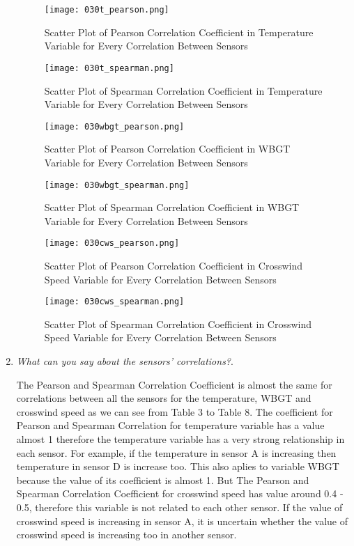 \documentclass[a4paper,12pt]{article} %
\begin{document}
\begin{enumerate}
\setlength{\belowcaptionskip}{-15pt}
\begin{figure}[H]
    \centering
    \texttt{[image: 030t\_pearson.png]}
    \caption{Scatter Plot of Pearson Correlation Coefficient in Temperature Variable for Every Correlation Between Sensors}
    \label{fig:my_label}
\end{figure}
\begin{figure}[H]
    \centering
    \texttt{[image: 030t\_spearman.png]}
    \caption{Scatter Plot of Spearman Correlation Coefficient in Temperature Variable for Every Correlation Between Sensors}
    \label{fig:my_label}
\end{figure}
\begin{figure}[H]
    \centering
    \texttt{[image: 030wbgt\_pearson.png]}
    \caption{Scatter Plot of Pearson Correlation Coefficient in WBGT Variable for Every Correlation Between Sensors}
    \label{fig:my_label}
\end{figure}
\begin{figure}[H]
    \centering
    \texttt{[image: 030wbgt\_spearman.png]}
    \caption{Scatter Plot of Spearman Correlation Coefficient in WBGT Variable for Every Correlation Between Sensors}
    \label{fig:my_label}
\end{figure}
\begin{figure}[H]
    \centering
    \texttt{[image: 030cws\_pearson.png]}
    \caption{Scatter Plot of Pearson Correlation Coefficient in Crosswind Speed Variable for Every Correlation Between Sensors}
    \label{fig:my_label}
\end{figure}
\begin{figure}[H]
    \centering
    \texttt{[image: 030cws\_spearman.png]}
    \caption{Scatter Plot of Spearman Correlation Coefficient in Crosswind Speed Variable for Every Correlation Between Sensors}
    \label{fig:my_label}
\end{figure}


	
\item {\it What can you say about the sensors’ correlations?}. %
	
The Pearson and Spearman Correlation Coefficient is almost the same for correlations between all the sensors for the temperature, WBGT and crosswind speed as we can see from Table 3 to Table 8. The coefficient for Pearson and Spearman Correlation for temperature variable has a value almost 1 therefore the temperature variable has a very strong relationship in each sensor. For example, if the temperature in sensor A is increasing then temperature in sensor D is increase too. This also aplies to variable WBGT because the value of its coefficient is almost 1. But The Pearson and Spearman Correlation Coefficient for crosswind speed has value around 0.4 - 0.5, therefore this variable is not related to each other sensor. If the value of crosswind speed is increasing in sensor A, it is uncertain whether the value of crosswind speed is increasing too in another sensor. 


\end{enumerate}
\end{document}
